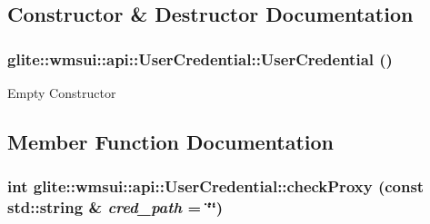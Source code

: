 \subsection{Constructor \& Destructor Documentation}
\hypertarget{classglite_1_1wmsui_1_1api_1_1UserCredential_a0}{
\subsubsection[UserCredential]{\setlength{\rightskip}{0pt plus 5cm}glite::wmsui::api::User\-Credential::User\-Credential ()}}
\label{classglite_1_1wmsui_1_1api_1_1UserCredential_a0}


Empty Constructor 

\subsection{Member Function Documentation}
\hypertarget{classglite_1_1wmsui_1_1api_1_1UserCredential_a1}{
\subsubsection[checkProxy]{\setlength{\rightskip}{0pt plus 5cm}int glite::wmsui::api::User\-Credential::check\-Proxy (const std::string \& {\em cred\_\-path} = \char`\"{}\char`\"{})}}
\label{classglite_1_1wmsui_1_1api_1_1UserCredential_a1}


